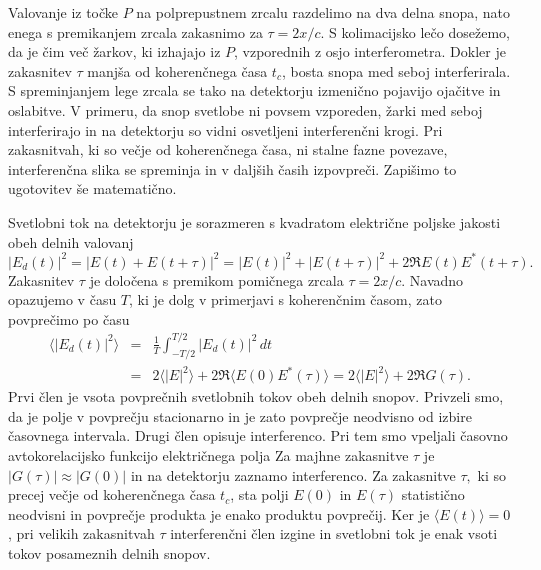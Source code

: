 Valovanje iz točke $P$ na polprepustnem 
zrcalu razdelimo na dva delna snopa, nato enega s premikanjem zrcala zakasnimo za $\tau=2x/c$.
S kolimacijsko lečo dosežemo, da je čim več žarkov, ki izhajajo iz
$P$, vzporednih z osjo interferometra. Dokler je zakasnitev
$\tau$ manjša od koherenčnega časa $t_{c}$, bosta snopa med seboj interferirala.
S spreminjanjem lege zrcala se tako na detektorju izmenično pojavijo ojačitve in oslabitve.
V primeru, da snop svetlobe ni povsem vzporeden, žarki med seboj interferirajo 
in na detektorju so vidni osvetljeni interferenčni krogi. Pri zakasnitvah,
ki so večje od koherenčnega časa, ni stalne fazne povezave, interferenčna
slika se spreminja in v daljših časih izpovpreči. Zapišimo to ugotovitev
še matematično.

Svetlobni tok na detektorju je sorazmeren s kvadratom električne
poljske jakosti obeh delnih valovanj
\begin{equation}
|E_{d}(t)|^{2}=|E(t)+E(t+\tau)|^{2}=|E(t)|^{2}+|E(t+\tau)|^{2}+2\Re E(t)E^{*}(t+\tau).
\label{eq:Michelson-intenziteta}
\end{equation}
Zakasnitev $\tau$ je določena s premikom pomičnega zrcala $\tau=2x/c$.
Navadno opazujemo v času $T$, ki je dolg v primerjavi s koherenčnim
časom, zato povprečimo po času
\begin{eqnarray}
\langle|E_{d}(t)|^{2}\rangle & = & \frac{1}{T}\int_{-T/2}^{T/2}|E{}_{d}(t)|^{2}\, dt\nonumber \\
 & = & 2\langle|E|^{2}\rangle+2\Re\langle E(0)E^{*}(\tau)\rangle = 2\langle|E|^{2}\rangle+2\Re G(\tau).
\end{eqnarray}
Prvi člen je vsota povprečnih svetlobnih tokov obeh delnih snopov. Privzeli
smo, da je polje v povprečju stacionarno in je zato povprečje neodvisno
od izbire časovnega intervala. Drugi člen opisuje interferenco. 
Pri tem smo vpeljali
časovno avtokorelacijsko funkcijo
električnega polja 
Za majhne zakasnitve $\tau$ je $|G(\tau)|\approx|G(0)|$ in na
detektorju zaznamo interferenco. Za zakasnitve $\tau,$ ki so precej
večje od koherenčnega časa $t_{c}$, sta polji $E(0)$ in $E(\tau)$
statistično neodvisni in povprečje produkta je enako produktu povprečij.
Ker je $\langle E(t)\rangle=0$, pri velikih zakasnitvah $\tau$ interferenčni
člen izgine in svetlobni tok je enak vsoti tokov posameznih delnih
snopov. 

